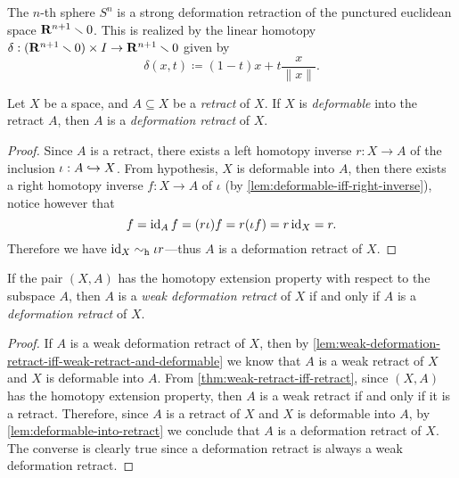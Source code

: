 \begin{example}
    \label{exp:Sn-is-strong-deformation-retract}
    The \(n\)-th sphere \(S^n\) is a strong deformation retraction of the punctured
    euclidean space \(\mathbf{R}^{n+1} \smallsetminus 0\). This is realized by the linear
    homotopy \(\delta: (\mathbf{R}^{n+1} \smallsetminus 0) \times I \to \mathbf{R}^{n+1} \smallsetminus 0\)
    given by
    \[
        \delta(x, t) \coloneq (1 - t) x + t \frac{x}{\| x \|}.
    \]
\end{example}

\begin{lemma}
    \label{lem:deformable-into-retract}
    Let \(X\) be a space, and \(A \subseteq X\) be a \emph{retract} of \(X\). If
    \(X\) is \emph{deformable} into the retract \(A\), then \(A\) is a
    \emph{deformation retract} of \(X\).
\end{lemma}

\begin{proof}
    Since \(A\) is a retract, there exists a left homotopy inverse \(r: X \to A\)
    of the inclusion \(\iota: A \hookrightarrow X\). From hypothesis, \(X\) is deformable into
    \(A\), then there exists a right homotopy inverse \(f: X \to A\) of \(\iota\)
    (by \cref{lem:deformable-iff-right-inverse}), notice however that
    \[
        f = \operatorname{id}_A f = (r \iota) f = r (\iota f) = r \operatorname{id}_X = r.
    \]
    Therefore we have \(\operatorname{id}_X \sim_{\text{h}} \iota r\)---thus \(A\) is a deformation retract
    of \(X\).
\end{proof}

\begin{corollary}
    \label{cor:htpy-extension-prop-weak-iff-deformation}
    If the pair \((X, A)\) has the homotopy extension property with respect to the
    subspace \(A\), then \(A\) is a \emph{weak deformation retract} of \(X\) if and
    only if \(A\) is a \emph{deformation retract} of \(X\).
\end{corollary}

\begin{proof}
    If \(A\) is a weak deformation retract of \(X\), then by
    \cref{lem:weak-deformation-retract-iff-weak-retract-and-deformable} we know that
    \(A\) is a weak retract of \(X\) and \(X\) is deformable into \(A\). From
    \cref{thm:weak-retract-iff-retract}, since \((X, A)\) has the homotopy extension
    property, then \(A\) is a weak retract if and only if it is a
    retract. Therefore, since \(A\) is a retract of \(X\) and \(X\) is deformable
    into \(A\), by \cref{lem:deformable-into-retract} we conclude that \(A\) is a
    deformation retract of \(X\). The converse is clearly true since a deformation
    retract is always a weak deformation retract.
\end{proof}

